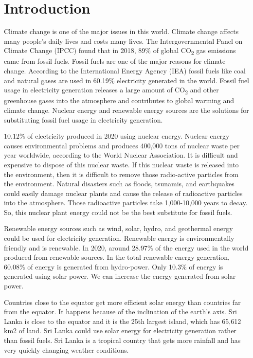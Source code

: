 \documentclass[conference]{IEEEtran}
\begin{document}
\section{Introduction}
Climate change is one of the major issues in this world. Climate change affects many people's daily lives and costs many lives. \cite {ipcc} The Intergovernmental Panel on Climate Change (IPCC) found that in 2018, 89\% of global CO\textsubscript{2} gas emissions came from fossil fuels. Fossil fuels are one of the major reasons for climate change. \cite{iea} According to the International Energy Agency (IEA) fossil fuels like coal and natural gases are used in 60.19\% electricity generated in the world. Fossil fuel usage in electricity generation releases a large amount of CO\textsubscript{2} and other greenhouse gases into the atmosphere and contributes to global warming and climate change. Nuclear energy and renewable energy sources are the solutions for substituting fossil fuel usage in electricity generation.

\cite{iea} \cite{bp} 10.12\% of electricity produced in 2020 using nuclear energy. Nuclear energy causes environmental problems and produces 400,000 tons of nuclear waste per year worldwide, according to the World Nuclear Association. It is difficult and expensive to dispose of this nuclear waste. If this nuclear waste is released into the environment, then it is difficult to remove those radio-active particles from the environment. Natural disasters such as floods, tsunamis, and earthquakes could easily damage nuclear plants and cause the release of radioactive particles into the atmosphere. \cite{wna} Those radioactive particles take 1,000-10,000 years to decay. So, this nuclear plant energy could not be the best substitute for fossil fuels.

Renewable energy sources such as wind, solar, hydro, and geothermal energy could be used for electricity generation. Renewable energy is environmentally friendly and is renewable. \cite{bp} In 2020, around 28.97\% of the energy used in the world produced from renewable sources. \cite{bp} In the total renewable energy generation, 60.08\% of energy is generated from hydro-power. Only 10.3\% of energy is generated using solar power. We can increase the energy generated from solar power.



Countries close to the equator get more efficient solar energy than countries far from the equator. It happens because of the inclination of the earth's axis. \cite {geo} Sri Lanka is close to the equator and it is the 25th largest island, which has 65,612 km2 of land. Sri Lanka could use solar energy for electricity generation rather than fossil fuels. Sri Lanka is a tropical country that gets more rainfall and has very quickly changing weather conditions.
\end{document}
